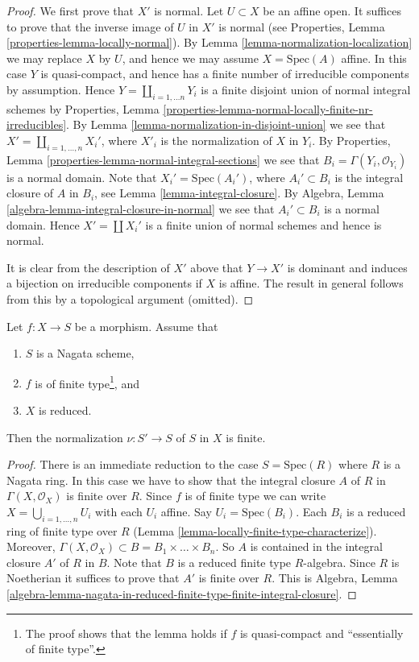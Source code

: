 \begin{proof}
We first prove that $X'$ is normal.
Let $U \subset X$ be an affine open. It suffices to prove that
the inverse image of $U$ in $X'$ is normal (see
Properties, Lemma \ref{properties-lemma-locally-normal}).
By Lemma \ref{lemma-normalization-localization} we may replace $X$ by $U$,
and hence we may assume $X = \text{Spec}(A)$ affine.
In this case $Y$ is quasi-compact, and hence has a finite number of
irreducible components by assumption. Hence
$Y = \coprod_{i = 1, \ldots n} Y_i$ is a finite disjoint union of
normal integral schemes by
Properties, Lemma \ref{properties-lemma-normal-locally-finite-nr-irreducibles}.
By Lemma \ref{lemma-normalization-in-disjoint-union}
we see that $X' = \coprod_{i = 1, \ldots, n} X_i'$,
where $X'_i$ is the normalization of $X$ in $Y_i$.
By Properties, Lemma \ref{properties-lemma-normal-integral-sections}
we see that $B_i = \Gamma(Y_i, \mathcal{O}_{Y_i})$ is a normal domain.
Note that $X_i' = \text{Spec}(A_i')$, where $A_i' \subset B_i$
is the integral closure of $A$ in $B_i$, see
Lemma \ref{lemma-integral-closure}. By 
Algebra, Lemma \ref{algebra-lemma-integral-closure-in-normal}
we see that $A_i' \subset B_i$ is a normal domain.
Hence $X' = \coprod X_i'$ is a finite union of normal schemes
and hence is normal.

\medskip\noindent
It is clear from the description of $X'$ above that $Y \to X'$
is dominant and induces a bijection on irreducible components if
$X$ is affine. The result in general follows from this by a topological
argument (omitted).
\end{proof}

\begin{lemma}
\label{lemma-nagata-normalization-finite}
Let $f : X \to S$ be a morphism.
Assume that
\begin{enumerate}
\item $S$ is a Nagata scheme,
\item $f$ is of finite type\footnote{The proof
shows that the lemma holds if $f$ is quasi-compact and ``essentially
of finite type''.}, and
\item $X$ is reduced.
\end{enumerate}
Then the normalization $\nu : S' \to S$ of $S$ in $X$ is finite.
\end{lemma}

\begin{proof}
There is an immediate reduction to the case $S = \text{Spec}(R)$
where $R$ is a Nagata ring. In this case we have to show that
the integral closure $A$ of $R$ in $\Gamma(X, \mathcal{O}_X)$ is
finite over $R$. Since $f$ is of finite type we can write
$X = \bigcup_{i = 1, \ldots, n} U_i$ with each $U_i$ affine.
Say $U_i = \text{Spec}(B_i)$. Each $B_i$ is a reduced ring of finite type
over $R$ (Lemma \ref{lemma-locally-finite-type-characterize}).
Moreover, $\Gamma(X, \mathcal{O}_X) \subset B = B_1 \times \ldots \times B_n$.
So $A$ is contained in the integral closure $A'$ of $R$ in $B$.
Note that $B$ is a reduced finite type $R$-algebra. Since $R$ is Noetherian
it suffices to prove that $A'$ is finite over $R$. This is
Algebra, Lemma
\ref{algebra-lemma-nagata-in-reduced-finite-type-finite-integral-closure}.
\end{proof}

